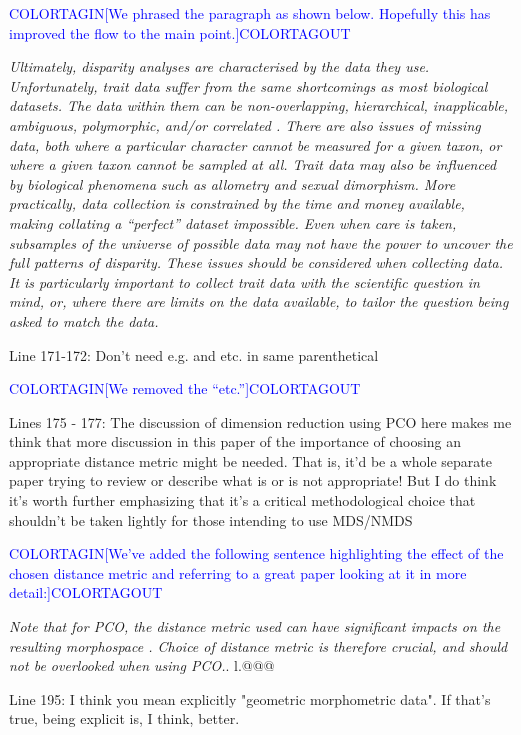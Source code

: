 \documentclass[12pt,letterpaper]{article}
\begin{document}
\textcolor{blue}{COLORTAGIN[We phrased the paragraph as shown below. Hopefully this has improved the flow to the main point.]COLORTAGOUT}

\textit{Ultimately, disparity analyses are characterised by the data they use. Unfortunately, trait data suffer from the same shortcomings as most biological datasets. The data within them can be non-overlapping, hierarchical, inapplicable, ambiguous, polymorphic, and/or correlated \citep{Palci2018}. There are also issues of missing data, both where a particular character cannot be measured for a given taxon, or where a given taxon cannot be sampled at all. Trait data may also be influenced by biological phenomena such as allometry and sexual dimorphism. More practically, data collection is constrained by the time and money available, making collating a ``perfect'' dataset impossible. Even when care is taken, subsamples of the universe of possible data may not have the power to uncover the full patterns of disparity. These issues should be considered when collecting data. It is particularly important to collect trait data with the scientific question in mind, or, where there are limits on the data available, to tailor the question being asked to match the data. 
}

\noindent Line 171-172: Don't need e.g. and etc. in same parenthetical

\textcolor{blue}{COLORTAGIN[We removed the  ``etc.'']COLORTAGOUT}

\noindent Lines 175 - 177: The discussion of dimension reduction using PCO here makes me think that more discussion in this paper of the importance of choosing an appropriate distance metric might be needed. That is, it'd be a whole separate paper trying to review or describe what is or is not appropriate! But I do think it's worth further emphasizing that it's a critical methodological choice that shouldn't be taken lightly for those intending to use MDS/NMDS

\textcolor{blue}{COLORTAGIN[We've added the following sentence highlighting the effect of the chosen distance metric and referring to a great paper looking at it in more detail:]COLORTAGOUT}

\textit{Note that for PCO, the distance metric used can have significant impacts on the resulting morphospace \citep{lehmann2019}. Choice of distance metric is therefore crucial, and should not be overlooked when using PCO.}. l.@@@


\noindent Line 195: I think you mean explicitly "geometric morphometric data". If that's true, being explicit is, I think, better.
\end{document}
